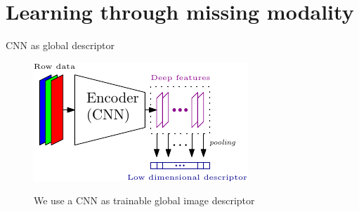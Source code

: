 \section{{\fontsize{25}{25}\selectfont Learning through missing modality}}

\label{sec:method}
\begin{frame}{CNN as global descriptor}
	\begin{figure}
		
		\includegraphics[width=0.5\linewidth]{vect/intro/Desc}
		
		We use a CNN as trainable global image descriptor
	\end{figure}
	\vfill	
\end{frame}


